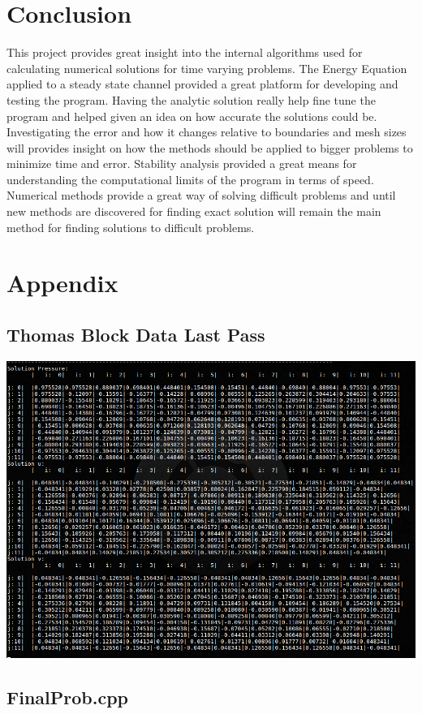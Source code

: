 \documentclass[paper=a4, fontsize=11pt, abstract=on]{scrartcl}
\numberwithin{equation}{section}		%
\numberwithin{figure}{section}			%
\numberwithin{table}{section}				%
\begin{document}
\section{Conclusion}
This project provides great insight into the internal algorithms used for calculating numerical solutions for time varying problems. The Energy Equation applied to a steady state channel provided a great platform for developing and testing the program. Having the analytic solution really help fine tune the program and helped given an idea on how accurate the solutions could be. Investigating the error and how it changes relative to boundaries and mesh sizes will provides insight on how the methods should be applied to bigger problems to minimize time and error. Stability analysis provided a great means for understanding the computational limits of the program in terms of speed. Numerical methods provide a great way of solving difficult problems and until new methods are discovered for finding exact solution will remain the main method for finding solutions to difficult problems. 





\newpage
\appendix
\section{Appendix} \label{App:Appendix}
\subsection{Thomas Block Data Last Pass}
\includegraphics[width=0.95\linewidth]{tom}

\subsection{FinalProb.cpp}
\begin{lstlisting}




\end{lstlisting}
\end{document}
